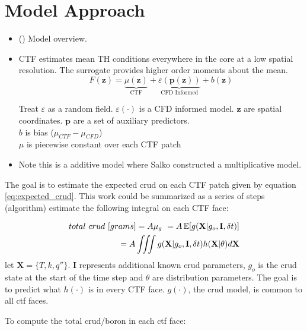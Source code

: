 
\section{Model Approach}

\begin{itemize}
	\item (\checkmark) Model overview.
    \item CTF estimates mean TH conditions everywhere in the core at a low spatial resolution.  The surrogate provides higher order moments about the mean.
    \begin{equation}
    F(\mathbf z) = \underbrace{\mu(\mathbf{z})}_\text{CTF} + \underbrace{\varepsilon({\mathbf p(\mathbf z)})}_\text{CFD Informed} + b(\mathbf{z})
    \end{equation}
    
    Treat $\varepsilon$ as a random field.  $\varepsilon(\cdot)$ is a CFD informed model. $\mathbf z$ are spatial coordinates. $\mathbf p$ are a set of auxiliary predictors. \\
    $b$ is bias ($\mu_{CTF} - \mu_{CFD}$) \\
    $\mu$ is piecewise constant over each CTF patch
    
    \item Note this is a additive model where Salko constructed a multiplicative model.
\end{itemize}

The goal is to estimate the expected crud on each CTF patch given by equation \ref{eq:expected_crud}.
This work could be summarized as a series of steps (algorithm) estimate the following integral on each CTF face:

\begin{eqnarray}
        total\ crud\ [grams] = A \mu_g\ = A \operatorname*{\mathbb{E}}[g(\mathbf X|g_o, \mathbf I, \delta t)] \nonumber \\
	= A \iiint g(\mathbf X|g_o, \mathbf I, \delta t) h(\mathbf X|\theta) d \mathbf X
	\label{eq:expected_crud}
\end{eqnarray}
let $\mathbf X= \{T, k, q''\}$. $\mathbf I$ represents additional known crud parameters, $g_o$ is the crud state at the start of the time step and $\theta$ are distribution parameters.  The goal is to predict what $h(\cdot)$ is in every CTF face.  $g(\cdot)$, the crud model, is common to all ctf faces.

To compute the total crud/boron in each ctf face:
\\


